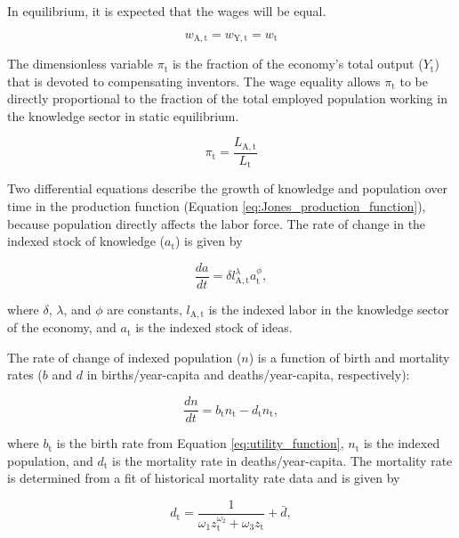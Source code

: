 \documentclass[letterpaper,12pt]{article}
\begin{document}
In equilibrium, it is expected that the wages will be equal.

\begin{equation} \label{eq:wage_equality}
	w_\mathrm{A,t} = w_\mathrm{Y,t} = w_\mathrm{t}
\end{equation}

The dimensionless variable $\pi_\mathrm{t}$ is the fraction of the economy's total output ($Y_\mathrm{t}$) that is devoted to compensating inventors. The wage equality allows $\pi_\mathrm{t}$ to be directly proportional to the fraction of the total employed population working in the knowledge sector in static equilibrium.

\begin{equation} \label{eq:pi}
	\pi_\mathrm{t} = \frac{L_\mathrm{A,t}}{L_\mathrm{t}}
\end{equation}

Two differential equations describe the growth of knowledge and population over time in the production function (Equation \ref{eq:Jones_production_function}), because population directly affects the labor force. The rate of change in the indexed stock of knowledge ($a_{\mathrm{t}}$) is given by

\begin{equation} \label{eq:da_dt}
	\frac{da}{dt} = \delta l_\mathrm{A,t}^\lambda a_\mathrm{t}^\phi,
\end{equation}

\noindent where $\delta$, $\lambda$, and $\phi$ are constants, $l_\mathrm{A,t}$ is the indexed labor in the knowledge sector of the economy, and $a_\mathrm{t}$ is the indexed stock of ideas.

The rate of change of indexed population ($n$) is a function of birth and mortality rates ($b$ and $d$ in births/year-capita and deaths/year-capita, respectively):

\begin{equation} \label{eq:dn_dt}
	\frac{dn}{dt} = b_\mathrm{t} n_\mathrm{t} - d_\mathrm{t} n_\mathrm{t},
\end{equation}

\noindent where $b_\mathrm{t}$ is the birth rate from Equation \ref{eq:utility_function}, $n_\mathrm{t}$ is the indexed population, and $d_\mathrm{t}$ is the mortality rate in deaths/year-capita. The mortality rate is determined from a fit of historical mortality rate data \citep{Jones:2001wn} and is given by

\begin{equation} \label{eq:mortality_rate}
	d_\mathrm{t} = \frac{1}{\omega_\mathrm{1} z_\mathrm{t}^{\omega_\mathrm{2}} + \omega_\mathrm{3} z_\mathrm{t}} + \bar d,
\end{equation}
\end{document}
